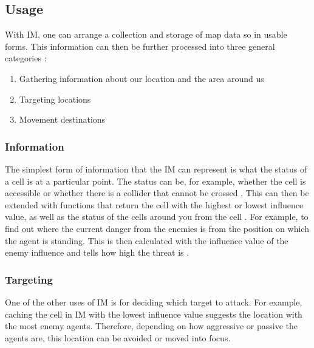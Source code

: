 \documentclass[]{report}
\begin{document}
	\subsection{Usage} \label{usage}
	With \ac{IM}, one can arrange a collection and storage of map data so in usable forms. This information can then be further processed into three general categories \citep{gameAIPro}:
	
	\begin{enumerate}
		\item Gathering information about our location and the area around us
		\item Targeting locations
		\item Movement destinations
	\end{enumerate}
	
	\subsubsection{Information}
	The simplest form of information that the \ac{IM} can represent is what the status of a cell is at a particular point. The status can be, for example, whether the cell is accessible or whether there is a collider that cannot be crossed \citep{gameAIPro}. This can then be extended with functions that return the cell with the highest or lowest influence value, as well as the status of the cells around you from the cell \citep{gameAIPro}. 
	For example, to find out where the current danger from the enemies is from the position on which the agent is standing. This is then calculated with the influence value of the enemy influence and tells how high the threat is \citep{gameAIPro}. 
	
	\subsubsection{Targeting}
	One of the other uses of \ac{IM} is for deciding which target to attack. For example, caching the cell in IM with the lowest influence value suggests the location with the most enemy agents. Therefore, depending on how aggressive or passive the agents are, this location can be avoided or moved into focus. \citep{gameAIPro}
	
\end{document}
